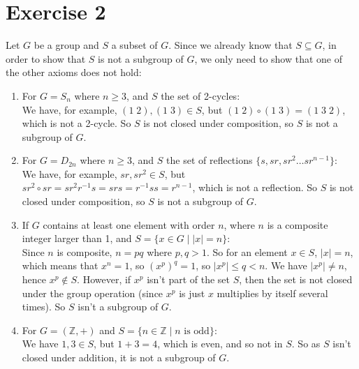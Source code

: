 \documentclass{article}
\newcommand{\Z}{\mathbb{Z}}
\begin{document}
    \section*{Exercise 2}
    Let $G$ be a group and $S$ a subset of $G$.
    Since we already know that $S \subseteq G$,
    in order to show that $S$ is not a subgroup of $G$,
    we only need to show that one of the other axioms does not hold: \\
    \begin{enumerate}[label=\textbf{\alph*.}]
        \item 
            For $G = S_n$ where $n \geqslant 3$,
            and $S$ the set of 2-cycles: \\
            We have, for example, $(1\;2), (1\;3) \in S$,
            but $(1\;2) \circ (1\;3) = (1\;3\;2)$, which is not a 2-cycle.
            So $S$ is not closed under composition,
            so $S$ is not a subgroup of $G$.
        \item 
            For $G = D_{2n}$ where $n \geqslant 3$,
            and $S$ the set of reflections $\{s, sr, sr^2 \dots sr^{n-1}\}$: \\
            We have, for example, $sr, sr^2 \in S$,
            but $sr^2 \circ sr = sr^2r^{-1}s = srs = r^{-1}ss = r^{n-1}$,
            which is not a reflection.
            So $S$ is not closed under composition,
            so $S$ is not a subgroup of $G$.
        \item 
            If $G$ contains at least one element with order $n$,
            where $n$ is a composite integer larger than 1,
            and $S = \{x \in G \mid |x| = n\}$: \\
            Since $n$ is composite, $n = pq$ where $p,q > 1$.
            So for an element $x \in S$, $|x| = n$,
            which means that $x^n = 1$,
            so $(x^p)^q = 1$, so $|x^p| \leqslant q < n$.
            We have $|x^p| \neq n$,
            hence $x^p \notin S$.
            However, if $x^p$ isn't part of the set $S$,
            then the set is not closed under the group operation
            (since $x^p$ is just $x$ multiplies by itself several times).
            So $S$ isn't a subgroup of $G$.
        \item 
            For $G = (\Z, +)$
            and $S = \{n \in \Z \mid n \text{ is odd} \}:$ \\
            We have $1, 3 \in S$, but $1 + 3 = 4$, which is even,
            and so not in $S$.
            So as $S$ isn't closed under addition,
            it is not a subgroup of $G$.

\end{enumerate}
\end{document}
